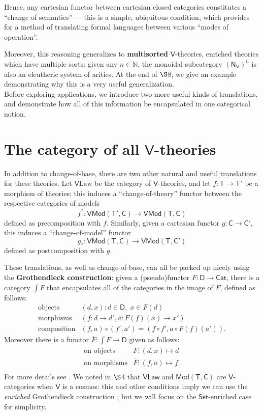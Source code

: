 \documentclass{amsart}
\theoremstyle{definition}
\newcommand{\Set}{\mathsf{Set}}
\newcommand{\Cat}{\mathsf{Cat}}
\newcommand{\Law}{\mathsf{Law}}
\newcommand{\Mod}{\mathsf{Mod}}
\newcommand{\NN}{\mathsf{N}}
\newcommand{\V}{\mathsf{V}}
\newcommand{\D}{\mathsf{D}}
\newcommand{\C}{\mathsf{C}}
\newcommand{\T}{\mathsf{T}}
\newcommand{\maps}{\colon}
\begin{document}
Hence, any cartesian functor between cartesian closed categories constitutes a ``change of semantics'' --- this is a simple, ubiquitous condition, which provides for a method of translating formal languages between various ``modes of operation''.

Moreover, this reasoning generalizes to \textbf{multisorted} $\V$-theories, enriched theories which have multiple sorts: given any $n\in \mathbb{N}$, the monoidal subcategory $(\NN_\V)^n$ is also an eleutheric system of arities. At the end of $\S$8, we give an example demonstrating why this is a very useful generalization.\\

Before exploring applications, we introduce two more useful kinds of translations, and demonstrate how all of this information be encapsulated in one categorical notion.

\section{The category of all $\V$-theories}

In addition to change-of-base, there are two other natural and useful translations for these theories. Let $\V\mathrm{Law}$ be the category of $\V$-theories, and let $f\maps\T\to \T'$ be a morphism of theories; this induces a ``change-of-theory'' functor between the respective categories of models $$f^*\maps\V\Mod(\T',\C)\to \V\Mod(\T,\C)$$ defined as precomposition with $f$. Similarly, given a cartesian functor $g\maps \C \to \C'$, this induces a ``change-of-model'' functor $$g_*\maps\V\Mod(\T,\C) \to \V\Mod(\T,\C')$$ defined as postcomposition with $g$.

These translations, as well as change-of-base, can all be packed up nicely using the \textbf{Grothendieck construction}: given a (pseudo)functor $F\maps \D \to \Cat$, there is a category $\int F$ that encapsulates all of the categories in the image of $F$, defined
as follows:
\[\begin{array}{rl}
\text{objects} & (d,x) \colon d\in \D, \; x\in F(d)\\
\text{morphisms} & (f\maps d\to d',a\maps F(f)(x)\to x')\\
\text{composition} & (f,a) \circ (f',a') = (f \circ f', a \circ F(f)(a')).
\end{array}\]
Moreover there is a functor $\overline{F} \maps \int F \to \D$ given as follows:
\[\begin{array}{rl}
\text{on objects} & \overline{F} \maps (d,x) \mapsto d \\
\text{on morphisms} & \overline{F} \maps (f,a) \mapsto f .\\
\end{array}\]
For more details see \cite{borceux,jacobs}.  We noted in $\S$4 that $\V\Law$ and $\Mod(\T,\C)$ are $\V$-categories when $\V$ is a cosmos: this and other conditions imply we can use the \textit{enriched} Grothendieck construction \cite{beardsleywong}; but we will focus on the $\Set$-enriched case for simplicity. 
\end{document}
